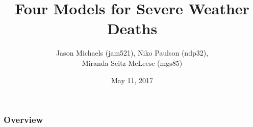 \documentclass{beamer}
\title[Four Models]{Four Models for Severe Weather Deaths} %
\author{Jason Michaels (jam521), Niko Paulson (ndp32), \\Miranda Seitz-McLeese (mgs85) } %
\date{May 11, 2017} %
\begin{document}
	
	\begin{frame}
		\titlepage %
	\end{frame}
	
	\begin{frame}
		\frametitle{Overview} %
		\tableofcontents %
	\end{frame}
	
\end{document}
